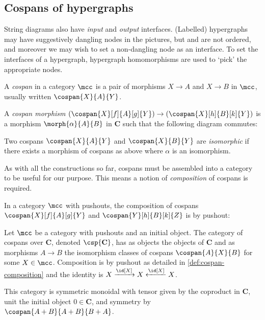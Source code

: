 \subsection{Cospans of hypergraphs}

String diagrams also have \emph{input} and \emph{output} interfaces.
(Labelled) hypergraphs may have suggestively dangling nodes in the pictures,
but and are not ordered, and moreover we may wish to set a non-dangling node
as an interface.
To set the interfaces of a hypergraph, hypergraph homomorphisms are used
to `pick' the appropriate nodes.

\begin{definition}[Cospan]
    A \emph{cospan} in a category \(\mcc\) is a pair of morphisms \(X \to A\)
    and \(X \to B\) in \(\mcc\), usually written \(\cospan{X}{A}{Y}\).

    A \emph{cospan morphism} \(
        (\cospan{X}[f]{A}[g]{Y}) \to (\cospan{X}[h]{B}[k]{Y})
    \) is a morphism \(\morph{\alpha}{A}{B}\) in \(\mathbf{C}\)
    such that the following diagram commutes:
    \begin{center}
        
    \end{center}
%
    Two cospans \(\cospan{X}{A}{Y}\) and \(\cospan{X}{B}{Y}\) are
    \emph{isomorphic} if there exists a morphism of cospans as above where
    \(\alpha\) is an isomorphism.
\end{definition}


As with all the constructions so far, cospans must be assembled into a category
to be useful for our purpose.
This means a notion of \emph{composition} of cospans is required.

\begin{definition}
    \label{def:cospan-composition}
    In a category \(\mcc\) with pushouts, the composition of cospans
    \(\cospan{X}[f]{A}[g]{Y}\) and \(\cospan{Y}[h]{B}[k]{Z}\) is by pushout:
    \begin{center}
        
    \end{center}
\end{definition}

\begin{definition}
    Let \(\mcc\) be a category with pushouts and an initial object.
    The category of cospans over \(\mathbf{C}\), denoted \(\csp{\mathbf{C}}\),
    has as objects the objects of \(\mathbf{C}\) and as morphisms \(A \to B\)
    the isomorphism classes of cospans \(\cospan{A}{X}{B}\) for some
    \(X \in \mcc\).
    Composition is by pushout as detailed in \cref{def:cospan-composition} and
    the identity is \(X \xrightarrow{\id[X]} X \xleftarrow{\id[X]} X\).

    This category is symmetric monoidal with tensor given by the coproduct in
    \(\mathbf{C}\), unit the initial object \(0 \in \mathbf{C}\), and symmetry
    by \(\cospan{A+B}{A+B}{B+A}\).
\end{definition}

